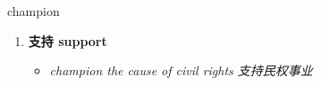 
\begin{frame}
{\huge champion}
\begin{center}
\begin{enumerate}\Large
  \item \textbf{支持 support}
  \begin{itemize}
    \item \em{\Large{champion the cause of civil rights 支持民权事业}}
  \end{itemize}
\end{enumerate}
\end{center}
\end{frame}
